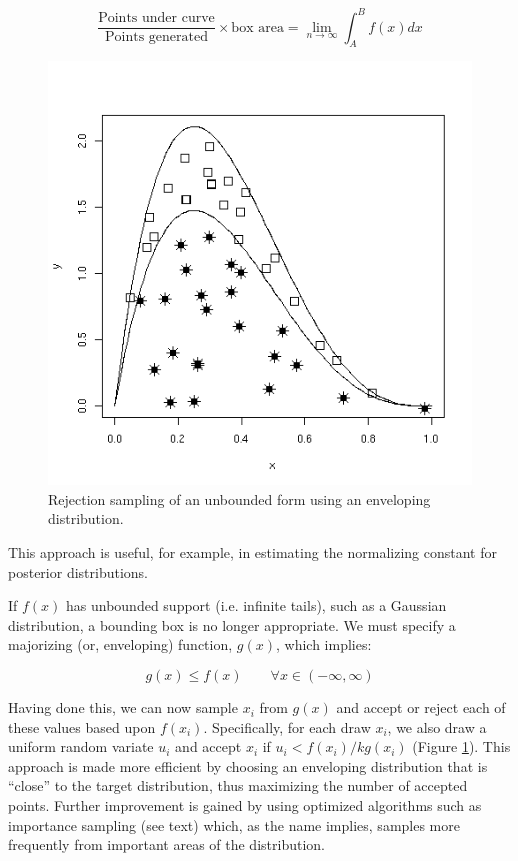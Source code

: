\[
\frac{\mbox{Points under curve}}{\mbox{Points generated}} \times \mbox{box area} = \lim_{n \to \infty} \int_A^B f(x) dx
\]

\begin{figure}[h]
        \begin{center}
        \includegraphics[scale=0.4]{envelope.png}
    \end{center}
    \caption{Rejection sampling of an unbounded form using an enveloping distribution.}
    \label{fig:unbound}
\end{figure}

\noindent This approach is useful, for example, in estimating the normalizing constant for posterior distributions.

If $f(x)$ has unbounded support (i.e. infinite tails), such as a Gaussian distribution, a bounding box is no longer appropriate. We must specify a majorizing (or, enveloping) function, $g(x)$, which implies:

\[
g(x) \le  f(x) \qquad\forall x \in (-\infty,\infty)
\]

Having done this, we can now sample ${x_i}$ from $g(x)$ and accept or reject each of these values based upon $f(x_i)$. Specifically, for each draw $x_i$, we also draw a uniform random variate $u_i$ and accept $x_i$ if $u_i < f(x_i)/kg(x_i)$ (Figure \ref{fig:unbound}). This approach is made more efficient by choosing an enveloping distribution that is ``close'' to the target distribution, thus maximizing the number of accepted points. Further improvement is gained by using optimized algorithms such as importance sampling (see text) which, as the name implies, samples more frequently from important areas of the distribution.

